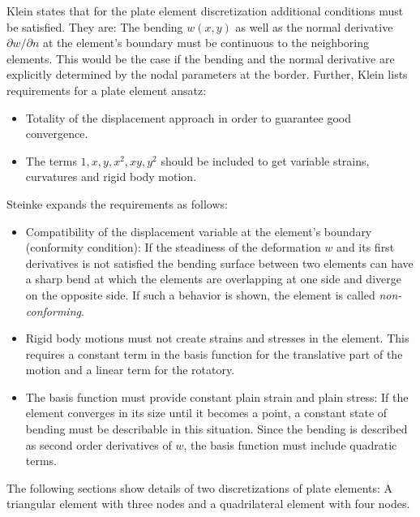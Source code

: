   Klein \cite{klein2013fem} states that for the plate element discretization additional conditions must be satisfied. They are: The bending $w(x,y)$ as well as the normal derivative $\partial w/\partial n$ at the element's boundary must be continuous to the neighboring elements. This would be the case if the bending and the normal derivative are explicitly determined by the nodal parameters at the border. Further, Klein lists requirements for a plate element ansatz:
  \begin{itemize}
  	\item Totality of the displacement approach in order to guarantee good convergence.
  	\item The terms $1, x, y, x^2, xy, y^2$ should be included to get variable strains, curvatures and rigid body motion.
  \end{itemize}
  Steinke \cite{steinke2005finite} expands the requirements as follows:
  \begin{itemize}
  	\item Compatibility of the displacement variable at the element's boundary (conformity condition): If the steadiness of the deformation $w$ and its first derivatives is not satisfied the bending surface between two elements can have a sharp bend at which the elements are overlapping at one side and diverge on the opposite side. If such a behavior is shown, the element is called \textit{non-conforming}.
  	\item Rigid body motions must not create strains and stresses in the element. This requires a constant term in the basis function for the translative part of the motion and a linear term for the rotatory.
  	\item The basis function must provide constant plain strain and plain stress: If the element converges in its size until it becomes a point, a constant state of bending must be describable in this situation. Since the bending is described as second order derivatives of $w$, the basis function must include quadratic terms.
  \end{itemize}
  The following sections show details of two discretizations of plate elements: A triangular element with three nodes and a quadrilateral element with four nodes.
  
